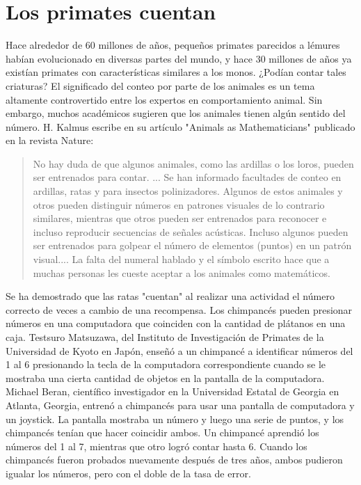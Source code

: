 \section*{Los primates cuentan}

\noindent Hace alrededor de 60 millones de años, pequeños primates parecidos a lémures habían evolucionado en diversas partes del mundo, y hace 30 millones de años ya existían primates con características similares a los monos. ¿Podían contar tales criaturas? El significado del conteo por parte de los animales es un tema altamente controvertido entre los expertos en comportamiento animal. Sin embargo, muchos académicos sugieren que los animales tienen algún sentido del número. H. Kalmus escribe en su artículo "Animals as Mathematicians" publicado en la revista Nature: \\

\begin{quote}
  No hay duda de que algunos animales, como las ardillas o los loros, pueden ser entrenados para contar. ... Se han informado facultades de conteo en ardillas, ratas y para insectos polinizadores. Algunos de estos animales y otros pueden distinguir números en patrones visuales de lo contrario similares, mientras que otros pueden ser entrenados para reconocer e incluso reproducir secuencias de señales acústicas. Incluso algunos pueden ser entrenados para golpear el número de elementos (puntos) en un patrón visual.... La falta del numeral hablado y el símbolo escrito hace que a muchas personas les cueste aceptar a los animales como matemáticos.
\end{quote}

\noindent Se ha demostrado que las ratas "cuentan" al realizar una actividad el número correcto de veces a cambio de una recompensa. Los chimpancés pueden presionar números en una computadora que coinciden con la cantidad de plátanos en una caja. Testsuro Matsuzawa, del Instituto de Investigación de Primates de la Universidad de Kyoto en Japón, enseñó a un chimpancé a identificar números del 1 al 6 presionando la tecla de la computadora correspondiente cuando se le mostraba una cierta cantidad de objetos en la pantalla de la computadora. \\

\noindent Michael Beran, científico investigador en la Universidad Estatal de Georgia en Atlanta, Georgia, entrenó a chimpancés para usar una pantalla de computadora y un joystick. La pantalla mostraba un número y luego una serie de puntos, y los chimpancés tenían que hacer coincidir ambos. Un chimpancé aprendió los números del 1 al 7, mientras que otro logró contar hasta 6. Cuando los chimpancés fueron probados nuevamente después de tres años, ambos pudieron igualar los números, pero con el doble de la tasa de error.
